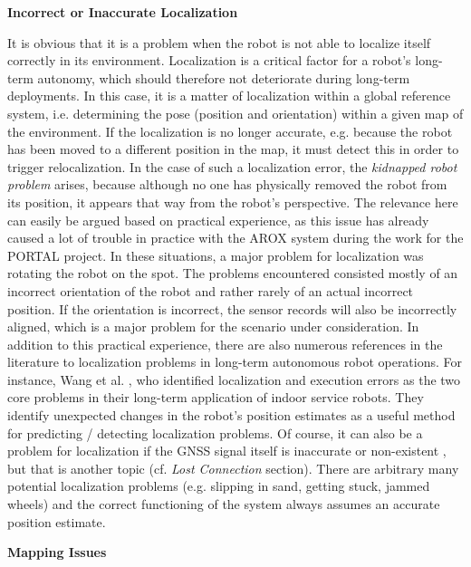 \documentclass[english, master, utf8]{base/thesis_KBS}
\begin{document}
\noindent
\textbf{Incorrect or Inaccurate Localization}\newline

\noindent
It is obvious that it is a problem when the robot is not able to localize itself correctly in its environment.
Localization is a critical factor for a robot's long-term autonomy, which should therefore not deteriorate during long-term deployments. \cite{Hawes:2017}
In this case, it is a matter of localization within a global reference system, i.e. determining the pose (position and orientation) within a given map of the environment.
If the localization is no longer accurate, e.g. because the robot has been moved to a different position in the map, it must detect this in order to
trigger relocalization. In the case of such a localization error, the \textit{kidnapped robot problem} arises, because although no one has 
physically removed the robot from its position, it appears that way from the robot's perspective. \cite{Hertzberg:2012}
The relevance here can easily be argued based on practical experience, as this issue has already caused a lot of trouble in practice with the AROX system during 
the work for the PORTAL project. In these situations, a major problem for localization was rotating the robot on the spot.
The problems encountered consisted mostly of an incorrect orientation of the robot and rather rarely of an actual incorrect position.
If the orientation is incorrect, the sensor records will also be incorrectly aligned, which is a major problem for the scenario under consideration.
In addition to this practical experience, there are also numerous references in the literature to localization problems in long-term autonomous robot operations. For instance,
Wang et al. \cite{Wang:2018}, who identified localization and execution errors as the two core problems in their long-term application of indoor service robots.
They identify unexpected changes in the robot's position estimates as a useful method for predicting / detecting localization problems.
Of course, it can also be a problem for localization if the GNSS signal itself is inaccurate or non-existent \cite{Churchill:2013}, but that is another topic (cf. \textit{Lost Connection} section).
There are arbitrary many potential localization problems (e.g. slipping in sand, getting stuck, jammed wheels) and the correct functioning of the system always assumes an accurate
position estimate. \cite{Goldberg:2002}\newline

\noindent
\textbf{Mapping Issues}\newline
\end{document}
